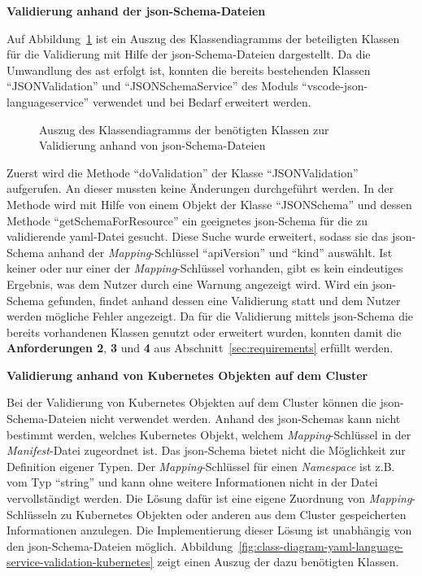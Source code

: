 \textbf{Validierung anhand der \ac{json}-Schema-Dateien}

Auf Abbildung~\ref{fig:class-diagram-yaml-language-service-validation} ist ein Auszug des Klassendiagramms der beteiligten Klassen
für die Validierung mit Hilfe der \ac{json}-Schema-Dateien dargestellt.
Da die Umwandlung des \ac{ast} erfolgt ist, konnten die bereits bestehenden Klassen ``JSONValidation'' und ``JSONSchemaService''
des Moduls ``vscode-json-languageservice'' verwendet und bei Bedarf erweitert werden.

\begin{figure}[htp] %
  \centering
  \caption{Auszug des Klassendiagramms der benötigten Klassen zur Validierung anhand von \ac{json}-Schema-Dateien}
  \label{fig:class-diagram-yaml-language-service-validation}
\end{figure}
Zuerst wird die Methode ``doValidation'' der Klasse ``JSONValidation'' aufgerufen.
An dieser mussten keine Änderungen durchgeführt werden. In der Methode wird mit Hilfe von einem Objekt der Klasse ``JSONSchema'' und dessen Methode ``getSchemaForResource'' ein geeignetes \ac{json}-Schema
für die zu validierende \ac{yaml}-Datei gesucht. Diese Suche wurde erweitert, sodass sie das \ac{json}-Schema anhand
der \textit{Mapping}-Schlüssel ``apiVersion'' und ``kind'' auswählt.
Ist keiner oder nur einer der \textit{Mapping}-Schlüssel vorhanden, gibt es kein eindeutiges Ergebnis, was dem Nutzer durch eine Warnung angezeigt wird.
Wird ein \ac{json}-Schema gefunden, findet anhand dessen eine Validierung statt und dem Nutzer werden mögliche Fehler angezeigt.
Da für die Validierung mittels \ac{json}-Schema die bereits vorhandenen Klassen genutzt oder erweitert wurden,
konnten damit die \textbf{Anforderungen 2}, \textbf{3} und \textbf{4} aus Abschnitt~\ref{sec:requirements} erfüllt werden.

\textbf{Validierung anhand von Kubernetes Objekten auf dem Cluster}

Bei der Validierung von Kubernetes Objekten auf dem Cluster können die \ac{json}-Schema-Dateien nicht verwendet werden.
Anhand des \ac{json}-Schemas kann nicht bestimmt werden, welches Kubernetes Objekt, welchem \textit{Mapping}-Schlüssel in der
\textit{Manifest}-Datei zugeordnet ist. Das \ac{json}-Schema bietet nicht die Möglichkeit zur Definition eigener Typen.
Der \textit{Mapping}-Schlüssel für einen \textit{Namespace} ist z.B. vom Typ ``string'' und kann ohne weitere Informationen nicht in der Datei vervollständigt werden.
Die Lösung dafür ist eine eigene Zuordnung von \textit{Mapping}-Schlüsseln zu Kubernetes Objekten oder anderen aus dem Cluster gespeicherten Informationen anzulegen.
Die Implementierung dieser Lösung ist unabhängig von den \ac{json}-Schema-Dateien möglich.
Abbildung~\ref{fig:class-diagram-yaml-language-service-validation-kubernetes} zeigt einen Auszug der dazu benötigten Klassen.

